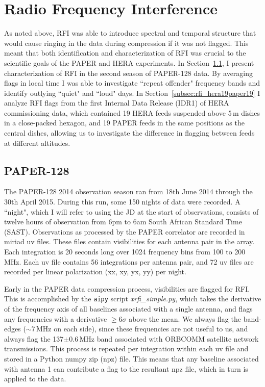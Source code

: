 \section{Radio Frequency Interference}
\label{sec:RFI}

As noted above, RFI was able to introduce spectral and temporal structure that would cause ringing in the data during compression if it was not flagged. This meant that both identification and characterization of RFI was crucial to the scientific goals of the PAPER and HERA experiments. In Section~\ref{subsec:rfi_paper128}, I present characterization of RFI in the second season of PAPER-128 data. By averaging flags in local time I was able to investigate ``repeat offender" frequency bands and identify outlying ``quiet" and ``loud" days.
In Section~\ref{subsec:rfi_hera19paper19} I analyze RFI flags from the first Internal Data Release (IDR1) of HERA commissioning data, which contained 19 HERA feeds suspended above 5\,m dishes in a close-packed hexagon, and 19 PAPER feeds in the same positions as the central dishes, allowing us to investigate the difference in flagging between feeds at different altitudes.

\subsection{PAPER-128}
\label{subsec:rfi_paper128}

The PAPER-128 2014 observation season ran from 18th June 2014 through the 30th April 2015. During this run, some 150 nights of data were recorded. A ``night", which I will refer to using the JD at the start of observations, consists of twelve hours of observation from 6pm to 6am South African Standard Time (SAST). Observations as processed by the PAPER correlator are recorded in {\sc miriad} uv files. These files contain visibilities for each antenna pair in the array. Each integration is 20 seconds long over 1024 frequency bins from 100 to 200\,MHz. Each uv file contains 56 integrations per antenna pair, and 72 uv files are recorded per linear polarization (xx, xy, yx, yy) per night.

Early in the PAPER data compression process, visibilities are flagged for RFI. This is accomplished by the {\tt aipy} script \textit{xrfi\_simple.py}, which takes the derivative of the frequency axis of all baselines associated with a single antenna, and flags any frequencies with a derivative $\geqslant 6\sigma$ above the mean. We always flag the band-edges ($\sim$7\,MHz on each side), since these frequencies are not useful to us, and always flag the 137$\pm$0.6\,MHz band associated with ORBCOMM satellite network transmissions. This process is repeated per integration within each uv file and stored in a Python numpy zip (npz) file. This means that any baseline associated with antenna 1 can contribute a flag to the resultant npz file, which in turn is applied to the data.

